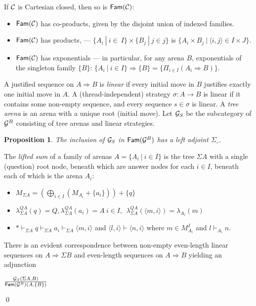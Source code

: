 \documentclass{eptcs}
\def\coprod{\bigoplus}
\def\C{{\cal{C}}}
\def\G{{\cal{G}}}
\newcommand{\Fam}{{\mathsf{Fam}}}
\newtheorem{proposition}[theorem]{Proposition}
\newif\ifqed
\newcommand{\qed}{\global\qedfalse\noindent\unskip\penalty50\null\nobreak\hskip1em\nobreak\hfill$\Box$}
\let\Box\undefined
\newenvironment{proof}[1][Proof]{\global\qedtrue\trivlist\item[\hskip\labelsep\textsc{#1:}]}{\ifqed\qed\fi\endtrivlist}
\begin{document}
If $\C$ is Cartesian closed, then so is $\Fam(\C)$:\begin{itemize}
\item $\Fam(\C)$ has co-products, given by the disjoint union of indexed families. 
\item $\Fam(\C)$ has products, --- $\{A_i \ |\ i\in\ I\} \times \{B_j \ |\ j \in j\}$ is $ \{A_i \times B_j \ | \ \langle i,j\rangle \in I \times J\}$. 
\item $\Fam(\C)$ has exponentials --- in particular, for any arena $B$,  exponentials of the singleton family $\{B\}$:  $\{A_i\ |\ i \in I\} \Rightarrow \{B\} = \{\Pi_{i \in I}(A_i \Rightarrow B)\}$. 
\end{itemize}
A justified sequence on $A \Rightarrow B$ is \emph{linear} if every initial move in $B$ justifies exactly one initial move in $A$. A
(thread-independent) strategy $\sigma:A \rightarrow B$ is linear if it contains some  non-empty sequence, and every sequence $s \in \sigma$ is linear.  A \emph{tree arena} is an arena with a unique root (initial move).
Let $\G_S$ be the subcategory of $\G^B$ consisting of tree arenas and linear strategies.     
\begin{proposition}The inclusion of $\G_S$ in $\Fam(\G^B)$ has a left adjoint $\Sigma\_$.
\end{proposition}
\begin{proof}
The \emph{lifted sum} \cite{AMV} of a family of arenas $A = \{A_i \ |\ i \in I\}$ is the tree $\Sigma A$ with a single (question) root node, beneath which are answer nodes for each $i \in I$, beneath each of which is the arena $A_i$:
\begin{itemize}
\item$M_{\Sigma A} = (\coprod_{i \in I}(M_{A_i} + \{a_i\})) + \{q\}$
\item$\lambda^{QA}_{\Sigma A}(q) = Q, \lambda^{QA}_{\Sigma A}(a_i) = A \ i \in I,\ \ \lambda^{QA}_{\Sigma A}(\langle m, i \rangle) = \lambda_{A_i}(m)$
\item$* \vdash_{\Sigma A} q \vdash_{\Sigma A} a_i \vdash_{\Sigma A} \langle m,i\rangle$ and $\langle l,i\rangle \vdash \langle n, i\rangle$   where $m \in M^I_{A_i}$ and $l \vdash_{A_i} n$.
\end{itemize}

There is an evident correspondence between non-empty even-length  linear sequences on $A \Rightarrow \Sigma B$ and even-length sequences on $A \Rightarrow B$  yielding an  adjunction \begin{center}
{\Large $\G_S(\Sigma A,B) \over \Fam(\G^B)(A,\{B\})$}
\end{center} 
\end{proof}
\end{document}
